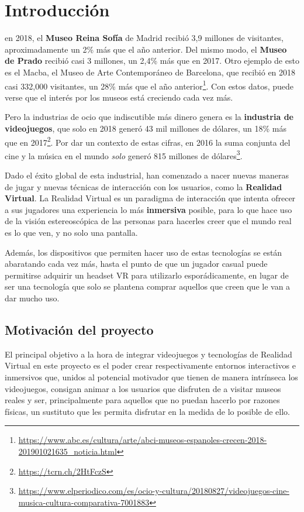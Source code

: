\chapter{Introducción}
\label{chap:introduccion}

 en 2018, el \textbf{Museo Reina Sofía} de Madrid recibió 3,9 millones de visitantes, aproximadamente un 2\% más que el año anterior. Del mismo modo, el \textbf{Museo de Prado} recibió casi 3 millones, un 2,4\% más que en 2017. Otro ejemplo de esto es el Macba, el Museo de Arte Contemporáneo de Barcelona, que recibió en 2018 casi 332,000 visitantes, un 28\% más que el año anterior\footnote{\url{https://www.abc.es/cultura/arte/abci-museos-espanoles-crecen-2018-201901021635_noticia.html}}. Con estos datos, puede verse que el interés por los museos está creciendo cada vez más.

Pero la industrias de ocio que indiscutible más dinero genera es la \textbf{industria de videojuegos}, que solo en 2018 generó 43 mil millones de dólares, un 18\% más que en 2017\footnote{\url{https://tcrn.ch/2HtFczS}}. Por dar un contexto de estas cifras, en 2016 la suma conjunta del cine y la música en el mundo \textit{solo} generó 815 millones de dólares\footnote{\url{https://www.elperiodico.com/es/ocio-y-cultura/20180827/videojuegos-cine-musica-cultura-comparativa-7001883}}.

Dado el éxito global de esta industrial, han comenzado a nacer nuevas maneras de jugar y nuevas técnicas de interacción con los usuarios, como la \textbf{Realidad Virtual}. La Realidad Virtual es un paradigma de interacción que intenta ofrecer a sus jugadores una experiencia lo más \textbf{inmersiva} posible, para lo que hace uso de la visión estereoscópica de las personas para hacerles creer que el mundo real es lo que ven, y no solo una pantalla.

Además, los dispositivos que permiten hacer uso de estas tecnologías se están abaratando cada vez más, hasta el punto de que un jugador casual puede permitirse adquirir un headset \acs{VR} para utilizarlo esporádicamente, en lugar de ser una tecnología que solo se plantena comprar aquellos que creen que le van a dar mucho uso.

\section{Motivación del proyecto}

El principal objetivo a la hora de integrar videojuegos y tecnologías de Realidad Virtual en este proyecto es el poder crear respectivamente entornos interactivos e inmersivos que, unidos al potencial motivador que tienen de manera intrínseca los videojuegos, consigan animar a los usuarios que disfruten de \MineRVa a visitar museos reales y ser, principalmente para aquellos que no puedan hacerlo por razones físicas, un sustituto que les permita disfrutar en la medida de lo posible de ello. 

